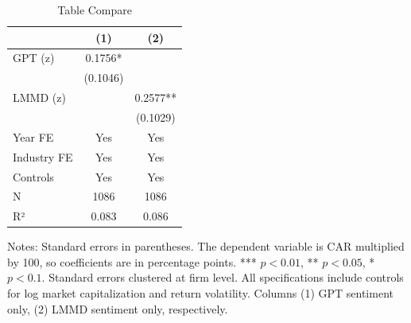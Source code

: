 \begin{table}[htbp]
\centering
\caption{Table Compare}
\label{tab:table_compare}
\begin{tabular}{lcc}
\toprule
 & (1) & (2) \\
\midrule
GPT (z) & 0.1756* &  \\
  & (0.1046) &  \\
LMMD (z) &  & 0.2577** \\
  &  & (0.1029) \\
\midrule
Year FE & Yes & Yes \\
Industry FE & Yes & Yes \\
Controls & Yes & Yes \\
N & 1086 & 1086 \\
R² & 0.083 & 0.086 \\
\bottomrule
\end{tabular}\begin{flushleft}
\footnotesize Notes: Standard errors in parentheses. The dependent variable is CAR multiplied by 100, so coefficients are in percentage points. *** $p<0.01$, ** $p<0.05$, * $p<0.1$. Standard errors clustered at firm level. All specifications include controls for log market capitalization and return volatility. Columns (1) GPT sentiment only, (2) LMMD sentiment only, respectively.
\end{flushleft}
\end{table}